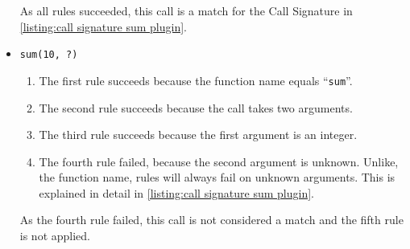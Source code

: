 \begin{itemize}
    As all rules succeeded, this call is a match for the Call Signature in \autoref{listing:call signature sum plugin}.

    \item \texttt{sum(10, ?)}
    \begin{enumerate}
        \item The first rule succeeds because the function name equals ``\texttt{sum}''.

        \item The second rule succeeds because the call takes two arguments.

        \item The third rule succeeds because the first argument is an integer.

        \item The fourth rule failed, because the second argument is unknown. Unlike, the function name, rules will always fail on unknown arguments. This is explained in detail in \autoref{listing:call signature sum plugin}.
    \end{enumerate}

    As the fourth rule failed, this call is not considered a match and the fifth rule is not applied.
\end{itemize}
